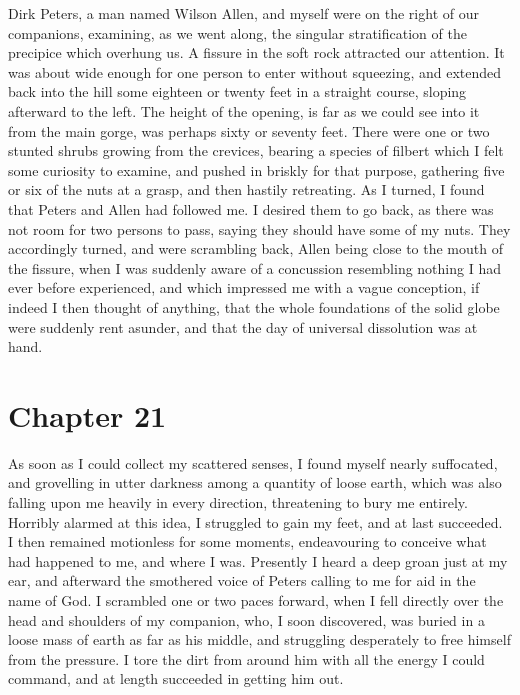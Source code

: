 Dirk Peters, a man named Wilson Allen, and myself were on the right of our
companions, examining, as we went along, the singular stratification of the
precipice which overhung us. A fissure in the soft rock attracted our attention.
It was about wide enough for one person to enter without squeezing, and extended
back into the hill some eighteen or twenty feet in a straight course, sloping
afterward to the left. The height of the opening, is far as we could see into it
from the main gorge, was perhaps sixty or seventy feet. There were one or two
stunted shrubs growing from the crevices, bearing a species of filbert which I
felt some curiosity to examine, and pushed in briskly for that purpose,
gathering five or six of the nuts at a grasp, and then hastily retreating. As I
turned, I found that Peters and Allen had followed me. I desired them to go
back, as there was not room for two persons to pass, saying they should have
some of my nuts. They accordingly turned, and were scrambling back, Allen being
close to the mouth of the fissure, when I was suddenly aware of a concussion
resembling nothing I had ever before experienced, and which impressed me with a
vague conception, if indeed I then thought of anything, that the whole
foundations of the solid globe were suddenly rent asunder, and that the day of
universal dissolution was at hand. 

\section{Chapter 21}
As soon as I could collect my scattered senses, I found myself nearly
suffocated, and grovelling in utter darkness among a quantity of loose earth,
which was also falling upon me heavily in every direction, threatening to bury
me entirely. Horribly alarmed at this idea, I struggled to gain my feet, and at
last succeeded. I then remained motionless for some moments, endeavouring to
conceive what had happened to me, and where I was. Presently I heard a deep
groan just at my ear, and afterward the smothered voice of Peters calling to me
for aid in the name of God. I scrambled one or two paces forward, when I fell
directly over the head and shoulders of my companion, who, I soon discovered,
was buried in a loose mass of earth as far as his middle, and struggling
desperately to free himself from the pressure. I tore the dirt from around him
with all the energy I could command, and at length succeeded in getting him
out. 

